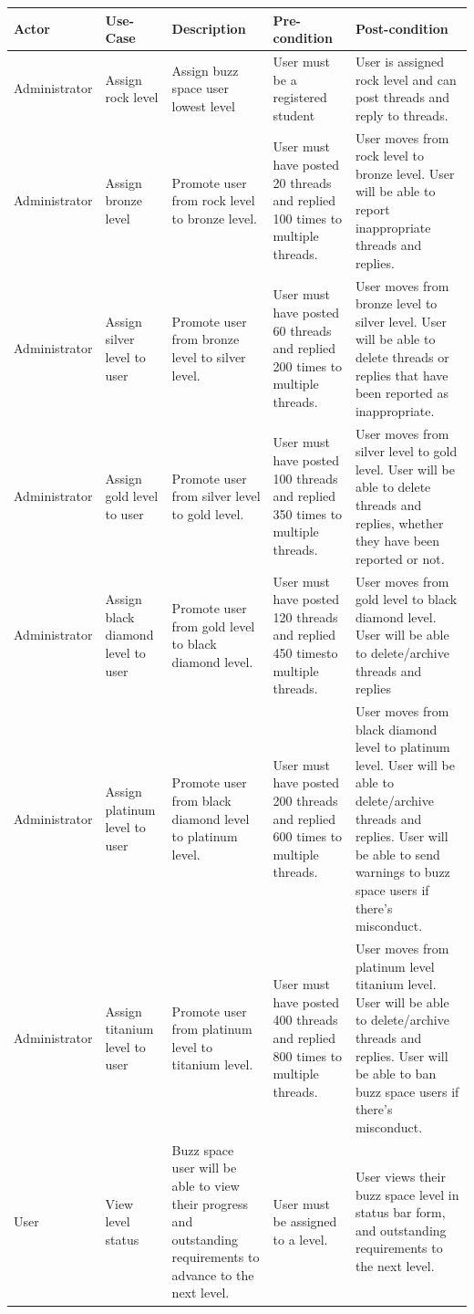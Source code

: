 \documentclass{article}
\begin{document}
\newpage
 \begin{table}
 	\begin{tabular}{p{3cm}p{3cm}p{3cm}p{3cm}p{3cm}}
 		\hline
 		Actor & Use-Case & Description & Pre-condition & Post-condition \\ \hline
 		Administrator & Assign rock level & Assign buzz space user lowest level & User must be a registered student & User is assigned rock level and can post threads and reply to threads.\\ \hline
 		Administrator & Assign bronze level & Promote user from rock level to bronze level. & User must have posted 20 threads and replied 100 times to multiple threads.  & User moves from rock level to bronze level. User will be able to report inappropriate threads and replies.\\ \hline
 		Administrator & Assign silver level to user & Promote user from bronze level to silver level. & User must have posted 60 threads and replied 200 times to multiple threads. & User moves from bronze level to silver level. User will be able to delete threads or replies that have been reported as inappropriate. \\ \hline
 		Administrator & Assign gold level to user & Promote user from silver level to gold level. & User must have posted 100 threads and replied 350 times to multiple threads. & User moves from silver level to gold level. User will be able to delete threads and replies, whether they have been reported or not. \\ \hline
 		Administrator & Assign black diamond level to user & Promote user from gold level to black diamond level. & User must have posted 120 threads and replied 450 timesto multiple threads. & User moves from gold level to black diamond level. User will be able to delete/archive threads and replies  \\ \hline
 		Administrator & Assign platinum level to user & Promote user from black diamond level to platinum level. & User must have posted 200 threads and replied 600 times to multiple threads. & User moves from black diamond level to platinum level. User will be able to delete/archive threads and replies. User will be able to send warnings to buzz space users if there’s misconduct. \\ \hline  Administrator & Assign titanium level to user & Promote user from platinum level to titanium level. & User must have posted 400 threads and replied 800 times to multiple threads. & User moves from platinum level titanium level. User will be able to delete/archive threads and replies. User will be able to ban buzz space users if there’s misconduct. \\ \hline 
 		User &  View level status & Buzz space user will be able to view their progress and outstanding requirements to advance to the next level. & User must be assigned to a level. & User views their buzz space level in status bar form, and outstanding requirements to the next level. \\ \hline
 	\end{tabular}
 \end{table}
\end{document}
